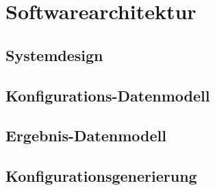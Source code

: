 \section{Softwarearchitektur}

\subsection{Systemdesign}

\subsection{Konfigurations-Datenmodell}

\subsection{Ergebnis-Datenmodell}

\subsection{Konfigurationsgenerierung}
